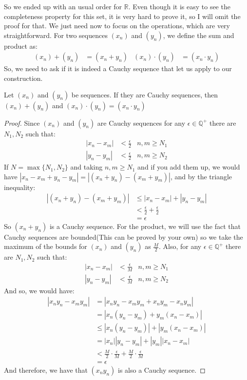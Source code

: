 \documentclass{tufte-handout}
\begin{document}
So we ended up with an usual order for $\mathbb{R}$. Even though it is easy to see the completeness property for this set, it is very hard to prove it, so I will omit the proof for that. We just need now to focus on the operations, which are very straightforward. For two sequences $(x_n)$ and $(y_n)$, we define the sum and product as:
\begin{align*}
	(x_n) + (y_n) &= (x_n + y_n) & (x_n) \cdot (y_n) &= (x_n \cdot y_n)
\end{align*}
So, we need to ask if it is indeed a Cauchy sequence that let us apply to our construction.
\begin{theorem}
	Let $(x_n)$ and $(y_n)$ be sequences. If they are Cauchy sequences, then $(x_n) + (y_n)$ and $(x_n) \cdot (y_n) = (x_n \cdot y_n)$
\end{theorem}
\begin{proof}
	Since $(x_n)$ and $(y_n)$ are Cauchy sequences for any $\epsilon \in \mathbb{Q}^+$ there are $N_1, N_2$ such that:
	\begin{align*}
		|x_n - x_m| &< \frac{\epsilon}{2} &n, m \ge N_1\\
		|y_n - y_m| &< \frac{\epsilon}{2} &n, m \ge N_2
	\end{align*}
	If $N = \max\{N_1, N_2\}$ and taking $n, m \ge N_1$ and if you add them up, we would have $|x_n - x_m + y_n - y_m| = |(x_n + y_n) - (x_m + y_m)|$, and by the triangle inequality:
	\begin{align*}
		|(x_n + y_n) - (x_m + y_m)| &\le |x_n - x_m| + |y_n - y_m|\\
		&< \frac{\epsilon}{2} + \frac{\epsilon}{2}\\
		&= \epsilon
	\end{align*}
	So $(x_n + y_n)$ is a Cauchy sequence. For the product, we will use the fact that Cauchy sequences are bounded(This can be proved by your own) so we take the maximum of the bounds for $(x_n)$ and $(y_n)$ as $\frac{M}{2}$. Also, for any $\epsilon \in \mathbb{Q}^+$ there are $N_1, N_2$ such that:
	\begin{align*}
		|x_n - x_m| &< \frac{\epsilon}{M} &n, m \ge N_1\\
		|y_n - y_m| &< \frac{\epsilon}{M} &n, m \ge N_2
	\end{align*}
	And so, we would have:
	\begin{align*}
		|x_ny_n - x_my_m| &= |x_ny_n - x_my_m + x_ny_m - x_ny_m|\\
		&= |x_n(y_n-y_m) + y_m(x_n-x_m)|\\
		&\le |x_n(y_n - y_m)| + |y_m(x_n - x_m)|\\
		&= |x_n||y_n-y_m| + |y_m||x_n-x_m|\\
		&< \frac{M}{2} \cdot \frac{\epsilon}{M} + \frac{M}{2} \cdot \frac{\epsilon}{M}\\
		&= \epsilon
	\end{align*}
	And therefore, we have that $(x_ny_n)$ is also a Cauchy sequence.
\end{proof}
\end{document}
